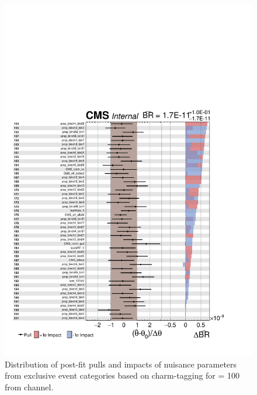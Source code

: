 \begin{figure}
\begin{center}
\includegraphics[width=1.0\textwidth]{Image/MLFit/ImpactNuis/nuisImpact4.pdf}
 \caption{Distribution of post-fit pulls and impacts of nuisance 
     parameters from exclusive event categories based on charm-tagging 
     for \mHp = 100 \GeV from \ljets channel.}
\label{fig:nuisImpact4}
\end{center}
\end{figure}

